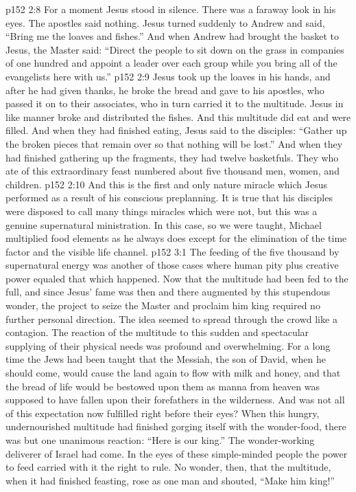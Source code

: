 \vs p152 2:8 For a moment Jesus stood in silence. There was a faraway look in his eyes. The apostles said nothing. Jesus turned suddenly to Andrew and said, \textcolor{ubdarkred}{“Bring me the loaves and fishes.”} And when Andrew had brought the basket to Jesus, the Master said: \textcolor{ubdarkred}{“Direct the people to sit down on the grass in companies of one hundred and appoint a leader over each group while you bring all of the evangelists here with us.”}
\vs p152 2:9 Jesus took up the loaves in his hands, and after he had given thanks, he broke the bread and gave to his apostles, who passed it on to their associates, who in turn carried it to the multitude. Jesus in like manner broke and distributed the fishes. And this multitude did eat and were filled. And when they had finished eating, Jesus said to the disciples: \textcolor{ubdarkred}{“Gather up the broken pieces that remain over so that nothing will be lost.”} And when they had finished gathering up the fragments, they had twelve basketfuls. They who ate of this extraordinary feast numbered about five thousand men, women, and children.\plusone
\pc \vs p152 2:10 And this is the first and only nature miracle which Jesus performed as a result of his conscious preplanning. It is true that his disciples were disposed to call many things miracles which were not, but this was a genuine supernatural ministration. In this case, so we were taught, Michael multiplied food elements as he always does except for the elimination of the time factor and the visible life channel.
\vs p152 3:1 The feeding of the five thousand by supernatural energy was another of those cases where human pity plus creative power equaled that which happened. Now that the multitude had been fed to the full, and since Jesus’ fame was then and there augmented by this stupendous wonder, the project to seize the Master and proclaim him king required no further personal direction. The idea seemed to spread through the crowd like a contagion. The reaction of the multitude to this sudden and spectacular supplying of their physical needs was profound and overwhelming. For a long time the Jews had been taught that the Messiah, the son of David, when he should come, would cause the land again to flow with milk and honey, and that the bread of life would be bestowed upon them as manna from heaven was supposed to have fallen upon their forefathers in the wilderness. And was not all of this expectation now fulfilled right before their eyes? When this hungry, undernourished multitude had finished gorging itself with the wonder\hyp{}food, there was but one unanimous reaction: “Here is our king.” The wonder\hyp{}working deliverer of Israel had come. In the eyes of these simple\hyp{}minded people the power to feed carried with it the right to rule. No wonder, then, that the multitude, when it had finished feasting, rose as one man and shouted, “Make him king!”
